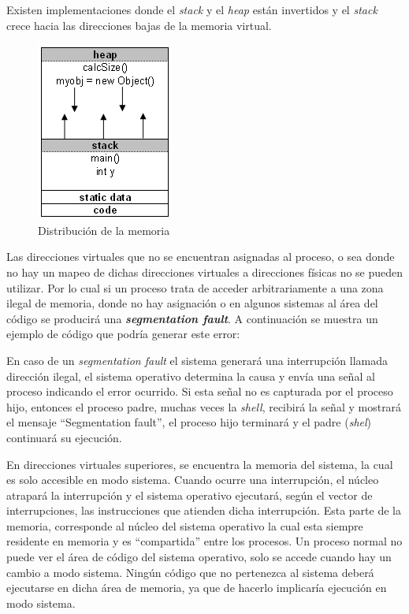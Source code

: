 Existen implementaciones donde el \textit{stack} y el \textit{heap} están
invertidos y el \textit{stack} crece hacia las direcciones  bajas de la memoria
virtual.

\begin{figure}[htbp]
\centering
\includegraphics[scale=1.00]{img/C04_procesos/HeapAndStack}
\caption{Distribución de la memoria}
\label{fig:memoria_proceso}
\end{figure}

Las direcciones virtuales que no se encuentran asignadas al proceso, o sea
donde no hay un mapeo de dichas direcciones virtuales a direcciones físicas no
se pueden utilizar. Por lo cual si un proceso trata de acceder arbitrariamente
a una zona ilegal de memoria, donde no hay asignación o en algunos sistemas al
área del código se producirá una \textbf{\textit{segmentation fault}}. A
continuación se muestra un ejemplo de código que podría generar este error:



En caso de un \textit{segmentation fault} el sistema generará una interrupción
llamada dirección ilegal, el sistema operativo determina la causa y envía una
señal al proceso indicando el error ocurrido. Si esta señal no es capturada por
el proceso hijo, entonces el proceso padre, muchas veces la \textit{shell},
recibirá la señal y mostrará el mensaje ``Segmentation fault'', el proceso hijo
terminará y el padre (\textit{shel}) continuará su ejecución.

En direcciones virtuales superiores, se encuentra la memoria del sistema, la
cual es solo accesible en modo sistema. Cuando ocurre una interrupción, el
núcleo atrapará la interrupción y el sistema operativo ejecutará, según el
vector de interrupciones, las instrucciones que atienden dicha interrupción.
Esta parte de la memoria, corresponde al núcleo del sistema operativo la cual
esta siempre residente en memoria y es ``compartida'' entre los procesos. Un
proceso normal no puede ver el área de código del sistema operativo, solo se
accede cuando hay un cambio a modo sistema. Ningún código que no pertenezca al
sistema deberá ejecutarse en dicha área de memoria, ya que de hacerlo implicaría
ejecución en modo sistema.

